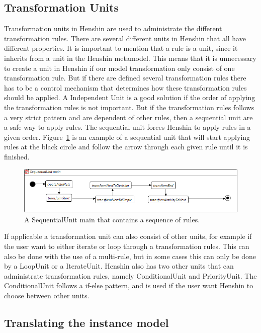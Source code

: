 \subsection{Transformation Units}
Transformation units in Henshin are used to administrate the different
transformation rules. There are several different units in Henshin that all have
different properties. It is important to mention that a rule is a unit,
since it inherits from a unit in the Henshin metamodel. This means that it is
unnecessary to create a unit in Henshin if our model transformation only
consist of one transformation rule. But if there are defined several
transformation rules there has to be a control mechanism that determines how
these transformation rules should be applied. A Independent Unit is a good
solution if the order of applying the transformation rules is not important.
But if the transformation rules follows a very strict pattern and are dependent
of other rules, then a sequential unit are a safe way to apply rules. The
sequential unit forces Henshin to apply rules in a given order.
Figure~\ref{fig:SequentialUnitHenshin} is an example of a sequential unit
that will start applying rules at the black circle and follow the arrow
through each given rule until it is finished.  

\begin{figure}[H]
	\centering
	\includegraphics[scale=0.5]{figures/SequentialUnitHenshin.png}
	\caption[A Sequential Unit in Henshin]
	{A SequentialUnit main that contains a sequence of rules.}
	\label{fig:SequentialUnitHenshin}
\end{figure}

If applicable a transformation unit can also consist of other units, for example
if the user want to either iterate or loop through a transformation rules. This
can also be done with the use of a multi-rule, but in some cases this can only
be done by a LoopUnit or a IterateUnit. Henshin also has two other units that
can administrate transformation rules, namely ConditionalUnit and PriorityUnit.
The ConditionalUnit follows a if-else pattern, and is used if the user want
Henshin to choose between other units. 

\subsection{Translating the instance model}

